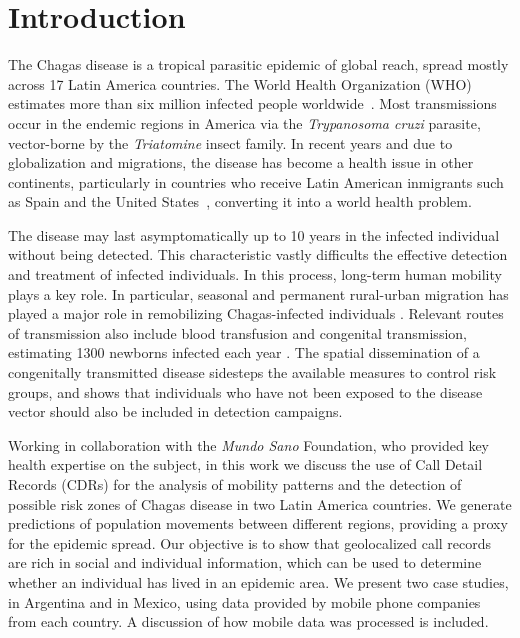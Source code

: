 \section{Introduction}

The Chagas disease is a tropical parasitic epidemic of global reach, spread mostly across 17 Latin America countries. The World Health Organization (WHO) estimates more than six million infected people worldwide~\cite{who2016}. Most transmissions occur in the endemic regions in America via the \textit{Trypanosoma cruzi} parasite, vector-borne by the \textit{Triatomine} insect family. In recent years and due to globalization and migrations, the disease has become a health issue in other continents, particularly in countries who receive Latin American inmigrants such as Spain and the United States~\cite{schmunis2010chagas}, converting it into a world health problem.

The disease may last asymptomatically up to 10 years in the infected individual without being detected. This characteristic vastly difficults the effective detection and treatment of infected individuals. In this process, long-term human mobility plays a key role. In particular, seasonal and permanent rural-urban migration has played a major role in remobilizing Chagas-infected individuals \cite{briceno2009chagas}. 
Relevant routes of transmission also include blood transfusion and congenital transmission, estimating 1300 newborns infected each year \cite{trabajos_de_}.
The spatial dissemination of a congenitally transmitted disease sidesteps the available measures to control risk groups, and shows that individuals who have not been exposed to the disease vector should also be included in detection campaigns.

Working in collaboration with the \textit{Mundo Sano} Foundation, who provided key health expertise on the subject, in this work we discuss the use of Call Detail Records (CDRs) for the analysis of mobility patterns and the detection of possible risk zones of Chagas disease in two Latin America countries. We generate predictions of population movements between different regions, providing a proxy for the epidemic spread. Our objective is to show that geolocalized call records are rich in social and individual information, which can be used to determine whether an individual has lived in an epidemic area. We present two case studies, in Argentina and in Mexico, using data provided by mobile phone companies from each country. A discussion of how mobile data was processed is included. 

